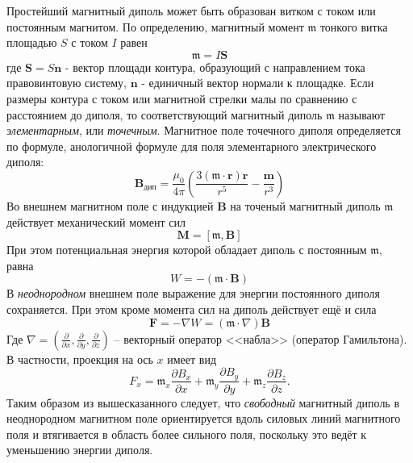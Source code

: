 \documentclass[a4paper, 12pt]{article}
\begin{document}
Простейший магнитный диполь может быть образован витком с током или постоянным магнитом. По определению, магнитный момент $\mathfrak{m}$ тонкого витка площадью $S$ с током $I$ равен 
\begin{equation}
	\mathfrak{m} = I\textbf{S}
\end{equation}
где $\textbf{S} = S\textbf{n}$ - вектор площади контура, образующий с направлением тока правовинтовую систему, $\textbf{n}$ - единичный вектор нормали к площадке. Если размеры контура с током или магнитной стрелки малы по сравнению с расстоянием до диполя, то соответствующий магнитный диполь $\mathfrak{m}$ называют \textit{элементарным}, или \textit{точечным}.
Магнитное поле точечного диполя определяется по формуле, анологичной формуле для поля элементарного электрического диполя:
\begin{equation}
    \textbf{B}_\text{дип} = \frac{\mu_0}{4\pi}\left(\frac{3(\mathfrak{m} \cdot \textbf{r})\textbf{r}}{r^5} - \frac{\textbf{m}}{r^3}\right)
    \label{2}
\end{equation}
Во внешнем магнитном поле с индукцией $\textbf{B}$ на точеный магнитный диполь $\mathfrak{m}$ действует механический момент сил 
\begin{equation}
	\textbf{M}=[\mathfrak{m}, \textbf{B}]
\end{equation}
При этом потенциальная энергия которой обладает диполь с постоянным $\mathfrak{m}$, равна 
\begin{equation}
	W = -(\mathfrak{m} \cdot \textbf{B})
\end{equation}
В \textit{неоднородном} внешнем поле выражение для энергии постоянного диполя сохраняется. При этом кроме момента сил на диполь действует ещё и сила 
\begin{equation}
	\textbf{F} = -\nabla W = (\mathfrak{m} \cdot \nabla)\textbf{B}
\end{equation}
Где $\nabla = \left(\frac{\partial}{\partial x},\frac{\partial}{\partial y}, \frac{\partial}{\partial z}\right)$ -- векторный оператор <<набла>> (оператор Гамильтона). В частности, проекция на ось $x$ имеет вид
\begin{equation}
    F_x = \mathfrak{m}_x\frac{\partial B_x}{\partial x} + \mathfrak{m}_y\frac{\partial B_y}{\partial y} + \mathfrak{m}_z\frac{\partial B_z}{\partial z}.
\end{equation}
Таким образом из вышесказанного следует, что \textit{свободный} магнитный диполь в неоднородном магнитном поле ориентируется вдоль силовых линий магнитного поля и втягивается в область более сильного поля, поскольку это ведёт к уменьшению энергии диполя.
\end{document}
